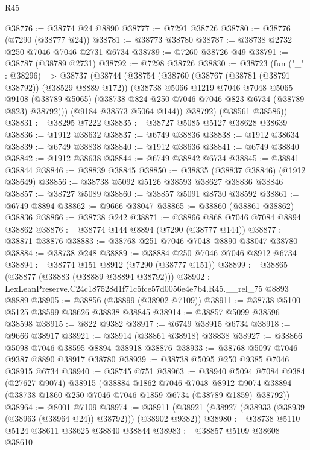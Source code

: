 \begin{lexlean}{R45}
\begin{coremodule}
{@38776 := @38774 @24 @8890
@38777 := @7291 @38726
@38780 := @38776 (@7290 (@38777 @24))
@38781 := @38773 @38780
@38787 := @38738 @2732 @250 @7046 @7046 @2731 @6734
@38789 := @7260 @38726 @49
@38791 := @38787 (@38789 @2731)
@38792 := @7298 @38726
@38830 := @38723
    (fun ("_" : @38296) =>
    @38737
      (@38744
        (@38754
          (@38760
            (@38767 (@38781 (@38791 @38792)) (@38529 @8889 @172))
            (@38738
              @5066
              @1219
              @7046
              @7048
              @5065
              @9108
              (@38789 @5065)
              (@38738 @824 @250 @7046 @7046 @823 @6734 (@38789 @823) @38792)))
          (@9184 @38573 @5064 @144))
        @38792)
      (@38561 @38586))
@38831 := @38295 @7222
@38835 := @38727 @5085 @5127 @38628 @38639
@38836 := @1912 @38632
@38837 := @6749 @38836
@38838 := @1912 @38634
@38839 := @6749 @38838
@38840 := @1912 @38636
@38841 := @6749 @38840
@38842 := @1912 @38638
@38844 := @6749 @38842 @6734
@38845 := @38841 @38844
@38846 := @38839 @38845
@38850 := @38835 (@38837 @38846) (@1912 @38649)
@38856 := @38738 @5092 @5126 @38593 @38627 @38836 @38846
@38857 := @38727 @5089
@38860 := @38857 @5091 @8730 @38592
@38861 := @6749 @8894
@38862 := @9666 @38047
@38865 := @38860 (@38861 @38862) @38836
@38866 := @38738 @242
@38871 := @38866 @868 @7046 @7084 @8894 @38862
@38876 := @38774 @144 @8894 (@7290 (@38777 @144))
@38877 := @38871 @38876
@38883 := @38768 @251 @7046 @7048 @8890 @38047 @38780
@38884 := @38738 @248
@38889 := @38884 @250 @7046 @7046 @8912 @6734
@38894 := @38774 @151 @8912 (@7290 (@38777 @151))
@38899 := @38865 (@38877 (@38883 (@38889 @38894 @38792)))
@38902 := LexLeanPreserve.C24c187528d1f71c5fce57d0056e4e7b4.R45.__rel_75 @8893 @8889
@38905 := @38856 (@38899 (@38902 @7109))
@38911 := @38738 @5100 @5125 @38599 @38626 @38838 @38845
@38914 := @38857 @5099 @38596 @38598
@38915 := @822 @9382
@38917 := @6749 @38915 @6734
@38918 := @9666 @38917
@38921 := @38914 (@38861 @38918) @38838
@38927 := @38866 @5098 @7046 @38595 @8894 @38918 @38876
@38933 := @38768 @5097 @7046 @9387 @8890 @38917 @38780
@38939 := @38738 @5095 @250 @9385 @7046 @38915 @6734
@38940 := @38745 @751
@38963 := @38940
    @5094
    @7084
    @9384
    (@27627 @9074)
    @38915
    (@38884
      @1862
      @7046
      @7048
      @8912
      @9074
      @38894
      (@38738 @1860 @250 @7046 @7046 @1859 @6734 (@38789 @1859) @38792))
@38964 := @8001 @7109
@38974 := @38911 (@38921 (@38927 (@38933 (@38939 (@38963 (@38964 @24)) @38792))) (@38902 @9382))
@38980 := @38738 @5110 @5124 @38611 @38625 @38840 @38844
@38983 := @38857 @5109 @38608 @38610
}
\end{coremodule}
\end{lexlean}
